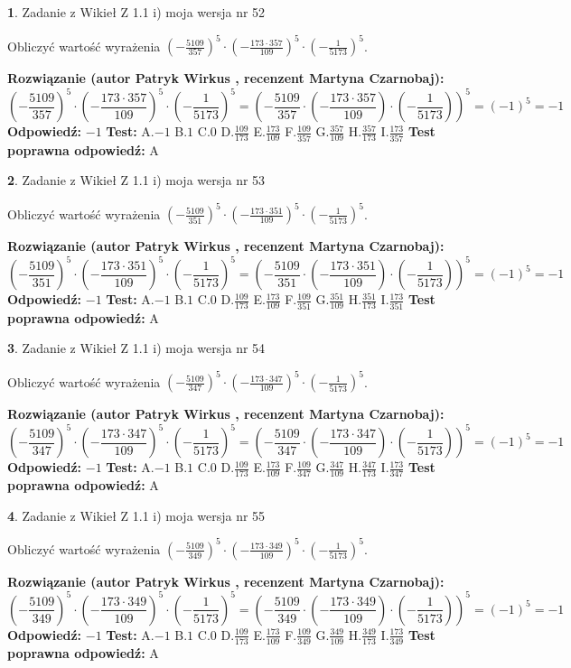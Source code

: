 \documentclass[12pt, a4paper]{article}
\theoremstyle{definition} %
\newtheorem{zad}{}
\newcommand{\zadStart}[1]{\begin{zad}#1\newline}
\newcommand{\zadStop}{\end{zad}}
\newcommand{\rozwStart}[2]{\noindent \textbf{Rozwiązanie (autor #1 , recenzent #2): }\newline}
\newcommand{\rozwStop}{\newline}
\newcommand{\odpStart}{\noindent \textbf{Odpowiedź:}\newline}
\newcommand{\odpStop}{\newline}
\newcommand{\testStart}{\noindent \textbf{Test:}\newline}
\newcommand{\testStop}{\newline}
\newcommand{\kluczStart}{\noindent \textbf{Test poprawna odpowiedź:}\newline}
\newcommand{\kluczStop}{\newline}
\begin{document}
\zadStart{Zadanie z Wikieł Z 1.1 i) moja wersja nr 52}

Obliczyć wartość wyrażenia $(-\frac{5109}{357})^{5} \cdot (-\frac{173 \cdot 357}{109})^{5} \cdot (-\frac{1}{5173})^{5}$.
\zadStop
\rozwStart{Patryk Wirkus}{Martyna Czarnobaj}
$$(-\frac{5109}{357})^{5} \cdot (-\frac{173 \cdot 357}{109})^{5} \cdot (-\frac{1}{5173})^{5} = (-\frac{5109}{357} \cdot (-\frac{173 \cdot 357}{109}) \cdot (-\frac{1}{5173}))^{5} = (-1)^{5} = -1$$
\rozwStop
\odpStart
$-1$
\odpStop
\testStart
A.$-1$ B.$1$ C.$0$ D.$\frac{109}{173}$ E.$\frac{173}{109}$
F.$\frac{109}{357}$ G.$\frac{357}{109}$
H.$\frac{357}{173}$
I.$\frac{173}{357}$
\testStop
\kluczStart
A
\kluczStop



\zadStart{Zadanie z Wikieł Z 1.1 i) moja wersja nr 53}

Obliczyć wartość wyrażenia $(-\frac{5109}{351})^{5} \cdot (-\frac{173 \cdot 351}{109})^{5} \cdot (-\frac{1}{5173})^{5}$.
\zadStop
\rozwStart{Patryk Wirkus}{Martyna Czarnobaj}
$$(-\frac{5109}{351})^{5} \cdot (-\frac{173 \cdot 351}{109})^{5} \cdot (-\frac{1}{5173})^{5} = (-\frac{5109}{351} \cdot (-\frac{173 \cdot 351}{109}) \cdot (-\frac{1}{5173}))^{5} = (-1)^{5} = -1$$
\rozwStop
\odpStart
$-1$
\odpStop
\testStart
A.$-1$ B.$1$ C.$0$ D.$\frac{109}{173}$ E.$\frac{173}{109}$
F.$\frac{109}{351}$ G.$\frac{351}{109}$
H.$\frac{351}{173}$
I.$\frac{173}{351}$
\testStop
\kluczStart
A
\kluczStop



\zadStart{Zadanie z Wikieł Z 1.1 i) moja wersja nr 54}

Obliczyć wartość wyrażenia $(-\frac{5109}{347})^{5} \cdot (-\frac{173 \cdot 347}{109})^{5} \cdot (-\frac{1}{5173})^{5}$.
\zadStop
\rozwStart{Patryk Wirkus}{Martyna Czarnobaj}
$$(-\frac{5109}{347})^{5} \cdot (-\frac{173 \cdot 347}{109})^{5} \cdot (-\frac{1}{5173})^{5} = (-\frac{5109}{347} \cdot (-\frac{173 \cdot 347}{109}) \cdot (-\frac{1}{5173}))^{5} = (-1)^{5} = -1$$
\rozwStop
\odpStart
$-1$
\odpStop
\testStart
A.$-1$ B.$1$ C.$0$ D.$\frac{109}{173}$ E.$\frac{173}{109}$
F.$\frac{109}{347}$ G.$\frac{347}{109}$
H.$\frac{347}{173}$
I.$\frac{173}{347}$
\testStop
\kluczStart
A
\kluczStop



\zadStart{Zadanie z Wikieł Z 1.1 i) moja wersja nr 55}

Obliczyć wartość wyrażenia $(-\frac{5109}{349})^{5} \cdot (-\frac{173 \cdot 349}{109})^{5} \cdot (-\frac{1}{5173})^{5}$.
\zadStop
\rozwStart{Patryk Wirkus}{Martyna Czarnobaj}
$$(-\frac{5109}{349})^{5} \cdot (-\frac{173 \cdot 349}{109})^{5} \cdot (-\frac{1}{5173})^{5} = (-\frac{5109}{349} \cdot (-\frac{173 \cdot 349}{109}) \cdot (-\frac{1}{5173}))^{5} = (-1)^{5} = -1$$
\rozwStop
\odpStart
$-1$
\odpStop
\testStart
A.$-1$ B.$1$ C.$0$ D.$\frac{109}{173}$ E.$\frac{173}{109}$
F.$\frac{109}{349}$ G.$\frac{349}{109}$
H.$\frac{349}{173}$
I.$\frac{173}{349}$
\testStop
\kluczStart
A
\kluczStop
\end{document}
